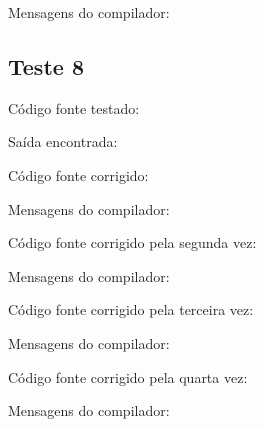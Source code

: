 \documentclass[11pt]{article}
\begin{document}
		Mensagens do compilador:
		


	\subsection{Teste 8}
	
		Código fonte testado:
		
		
		Saída encontrada:
		
										
		Código fonte corrigido:
		
		
		Mensagens do compilador:
		
								
		Código fonte corrigido pela segunda vez:
		
		
		Mensagens do compilador:
		
				
		Código fonte corrigido pela terceira vez:
		
		
		Mensagens do compilador:
		
				
		Código fonte corrigido pela quarta vez:
		
		
		Mensagens do compilador:
		
\end{document}
